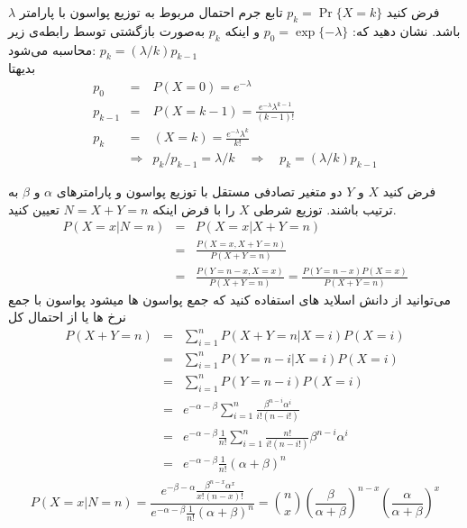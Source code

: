 \documentclass[11pt, a4, twoside]{article}
\begin{document}
\begin{problem}			
    فرض کنید $p_k = \Pr\{X = k\}$ تابع جرم احتمال مربوط به توزیع پواسون با پارامتر $\lambda$ باشد. نشان دهید که:
    \(
    p_0 = \exp\{-\lambda\}
    \)
    و اینکه $p_k$ به‌صورت بازگشتی توسط رابطه‌ی زیر محاسبه می‌شود:
    \(
    p_k = (\lambda / k) p_{k-1}
    \)
    {\\ \color{blue}
    بدیهتا 
    \begin{eqnarray*}
        p_0 &=& P(X = 0) = e^{-\lambda} \\
        p_{k-1} &=& P(X = k-1) = \frac{e^{-\lambda} \lambda^{k-1}}{(k-1)!} \\
        p_k &=& (X = k) = \frac{e^{-\lambda} \lambda^k}{k!} \\
        &\Rightarrow& p_k/p_{k-1} = \lambda/k \quad \Rightarrow \quad p_k = (\lambda/k)p_{k-1}
    \end{eqnarray*}
    }
\end{problem}
\begin{problem}
    فرض کنید $X$ و $Y$ دو متغیر تصادفی مستقل با توزیع پواسون و پارامترهای $\alpha$ و $\beta$ به ترتیب باشند. توزیع شرطی $X$ را با فرض اینکه $N = X + Y = n$ تعیین کنید.
    {\\ \color{blue}
    \begin{eqnarray*}
        P(X = x |N = n) &=& P(X = x  | X + Y = n) \\
        &=& \frac{P(X = x , X + Y = n)}{P(X+Y = n)} \\
        &=& \frac{P(Y = n - x, X = x)}{P(X + Y = n)} = \frac{P(Y = n - x)P(X = x)}{P(X + Y = n)}
    \end{eqnarray*}
    می‌توانید از دانش اسلاید های استفاده کنید که جمع پواسون ها میشود پواسون با جمع نرخ ها یا از احتمال کل
    \begin{eqnarray*}
        P(X + Y = n) &=& \sum_{i = 1}^n P(X + Y = n | X = i)P(X=i) \\
        &=& \sum_{i = 1}^n P(Y = n - i | X = i)P(X = i) \\
        &=& \sum_{i = 1}^n P(Y = n - i)P(X = i) \\
        &=& e^{-\alpha -\beta} \sum_{i = 1}^n \frac{\beta^{n-i}\alpha^i}{i! (n-i!)} \\
        &=& e^{-\alpha -\beta} \frac{1}{n!}\sum_{i = 1}^n \frac{n!}{i! (n-i!)}\beta^{n-i}\alpha^i \\
        &=& e^{-\alpha -\beta} \frac{1}{n!}\left(\alpha + \beta\right)^n \\
    \end{eqnarray*}
    \[ P(X = x |N = n) = \frac{e^{-\beta-\alpha}\frac{\beta^{n-x}\alpha^x}{x!(n-x)!} }{e^{-\alpha -\beta} \frac{1}{n!}\left(\alpha + \beta\right)^n} = \binom{n}{x}\left(\frac{\beta}{\alpha+\beta}\right)^{n-x}\left(\frac{\alpha}{\alpha+\beta}\right)^x\]
    }
\end{problem}
\end{document}
